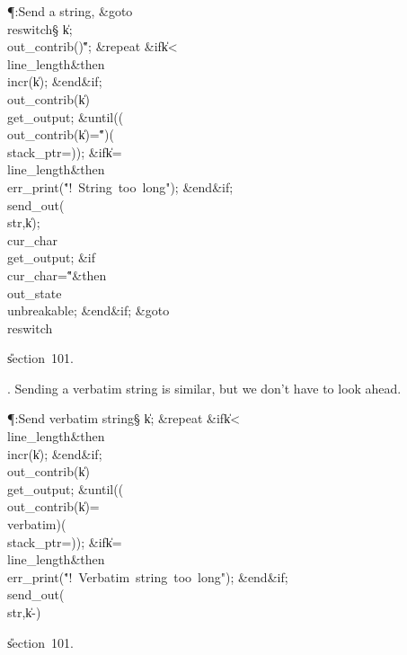 \Y\P\?\4:Send a string, \&{goto}\8\\{reswitch}\X\S\?\6
\|k\?\K{};\5
\\{out\_contrib}\?\1(\?\2)\K\?\H{"};\6
\1\&{repeat}\6
\&{if}\1\1\8\|k\?<\?\\{line\_length}\2\8\&{then}\6
\\{incr}\?\1(\?\|k\?\2)\?;\2\6
\&{end}\8\2\&{if}\1;\6
\\{out\_contrib}\?\1(\?\|k\?\2)\K\?\\{get\_output};\2\6
\&{until}\?\8\1(\1(\?\\{out\_contrib}\?\1(\?\|k\?\2)=\?\H{"}\?\2)\V\1(\?%
\\{stack\_ptr}\?=\?\2)\2)\?;\6
\&{if}\1\1\8\|k\?=\?\\{line\_length}\2\8\&{then}\6
\\{err\_print}\?\1(\?\.{"!\ String\ too\ long"}\?\2)\?;\2\6
\&{end}\8\2\&{if}\1;\6
\\{send\_out}\?\1(\?\\{str}\?,\?\|k\?\2)\?;\5
\\{cur\_char}\?\K\?\\{get\_output};\6
\&{if}\1\1\8\\{cur\_char}\?=\?\H{"}\2\8\&{then}\6
\\{out\_state}\?\K\?\\{unbreakable};\2\6
\&{end}\8\2\&{if}\1;\6
\&{goto}\8\\{reswitch}\par
\U section~101.\fi

. Sending a verbatim string is similar, but we don't have to look ahead.

\Y\P\?\4:Send verbatim string\X\S\?\6
\|k\?\K{};\6
\1\&{repeat}\6
\&{if}\1\1\8\|k\?<\?\\{line\_length}\2\8\&{then}\6
\\{incr}\?\1(\?\|k\?\2)\?;\2\6
\&{end}\8\2\&{if}\1;\6
\\{out\_contrib}\?\1(\?\|k\?\2)\K\?\\{get\_output};\2\6
\&{until}\?\8\1(\1(\?\\{out\_contrib}\?\1(\?\|k\?\2)=\?\\{verbatim}\?\2)\V\1(\?%
\\{stack\_ptr}\?=\?\2)\2)\?;\6
\&{if}\1\1\8\|k\?=\?\\{line\_length}\2\8\&{then}\6
\\{err\_print}\?\1(\?\.{"!\ Verbatim\ string\ too\ long"}\?\2)\?;\2\6
\&{end}\8\2\&{if}\1;\6
\\{send\_out}\?\1(\?\\{str}\?,\?\|k\?-\?\2)\?\par
\U section~101.\fi


